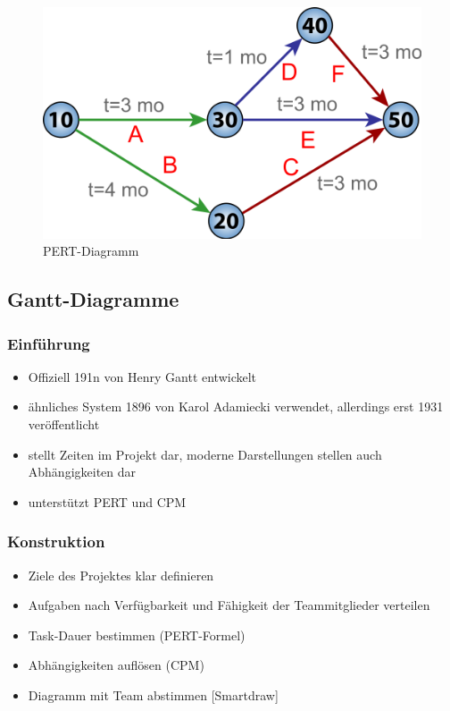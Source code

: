 \documentclass[%
	handout
]{beamer}
\newcommand{\howtogantt}{[Smartdraw]}
\begin{document}
		\begin{frame}
			\begin{figure}
				\begin{center}
					\includegraphics[scale=.2]{../images/pert.png}
					\caption{PERT-Diagramm}
					\label{img:pert}
				\end{center}
			\end{figure}
		\end{frame}
		
	\subsection{Gantt-Diagramme}
		\begin{frame}
			\frametitle{Einführung}
			\begin{itemize}
				\item Offiziell 191n von Henry Gantt entwickelt \pause
				\item ähnliches System 1896 von Karol Adamiecki verwendet, allerdings erst 1931 veröffentlicht\pause
				\item stellt Zeiten im Projekt dar\pause, moderne Darstellungen stellen auch Abhängigkeiten dar\pause
				\item unterstützt PERT und CPM
			\end{itemize}
		\end{frame}
		
		\begin{frame}
			\frametitle{Konstruktion}
			\begin{itemize}
				\item Ziele des Projektes klar definieren\pause
				\item Aufgaben nach Verfügbarkeit und Fähigkeit der Teammitglieder verteilen\pause
				\item Task-Dauer bestimmen (PERT-Formel)\pause
				\item Abhängigkeiten auflösen (CPM)\pause
				\item Diagramm mit Team abstimmen \howtogantt
			\end{itemize}
		\end{frame}
		
\end{document}
